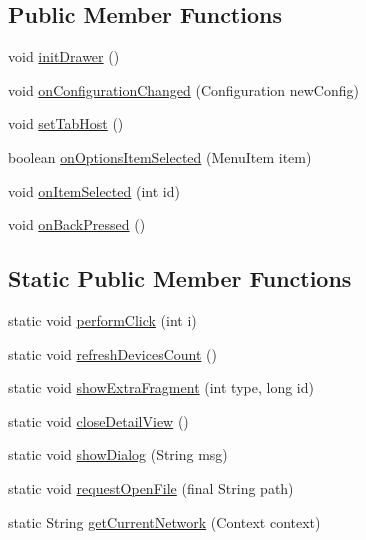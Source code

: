 \subsection*{Public Member Functions}
\begin{DoxyCompactItemize}
\item 
void \hyperlink{classandroid_1_1app_1_1printerapp_1_1_main_activity_a4aae7026bf84b2a4ae44fa862fcf57c4}{init\+Drawer} ()
\item 
void \hyperlink{classandroid_1_1app_1_1printerapp_1_1_main_activity_abd982691007e7a678764d58a968d2841}{on\+Configuration\+Changed} (Configuration new\+Config)
\item 
void \hyperlink{classandroid_1_1app_1_1printerapp_1_1_main_activity_abbf3c8b70e2b181f975ca50b1d2a900f}{set\+Tab\+Host} ()
\item 
boolean \hyperlink{classandroid_1_1app_1_1printerapp_1_1_main_activity_aefcfb4a58dd4199bd68519b18265037b}{on\+Options\+Item\+Selected} (Menu\+Item item)
\item 
void \hyperlink{classandroid_1_1app_1_1printerapp_1_1_main_activity_a22ce04847f41999bd705d5da2d54cee1}{on\+Item\+Selected} (int id)
\item 
void \hyperlink{classandroid_1_1app_1_1printerapp_1_1_main_activity_a7bfa12290c295ee48c56f9f1e933b03a}{on\+Back\+Pressed} ()
\end{DoxyCompactItemize}
\subsection*{Static Public Member Functions}
\begin{DoxyCompactItemize}
\item 
static void \hyperlink{classandroid_1_1app_1_1printerapp_1_1_main_activity_a30c32b121a07699504bbdadb55e45800}{perform\+Click} (int i)
\item 
static void \hyperlink{classandroid_1_1app_1_1printerapp_1_1_main_activity_a0189294c0dd9a208a64385b10a87e317}{refresh\+Devices\+Count} ()
\item 
static void \hyperlink{classandroid_1_1app_1_1printerapp_1_1_main_activity_a3605c952ef647e7ffc2d27041af3f722}{show\+Extra\+Fragment} (int type, long id)
\item 
static void \hyperlink{classandroid_1_1app_1_1printerapp_1_1_main_activity_ae2c29149af94926f0331e11d3f774b7a}{close\+Detail\+View} ()
\item 
static void \hyperlink{classandroid_1_1app_1_1printerapp_1_1_main_activity_a0e0e8254b3455ef2947635e2f6350aa1}{show\+Dialog} (String msg)
\item 
static void \hyperlink{classandroid_1_1app_1_1printerapp_1_1_main_activity_afd401ae0fa394f169f9b2828cd272393}{request\+Open\+File} (final String path)
\item 
static String \hyperlink{classandroid_1_1app_1_1printerapp_1_1_main_activity_a43185b2781a7990c45f703ef7a0d5df7}{get\+Current\+Network} (Context context)
\end{DoxyCompactItemize}
